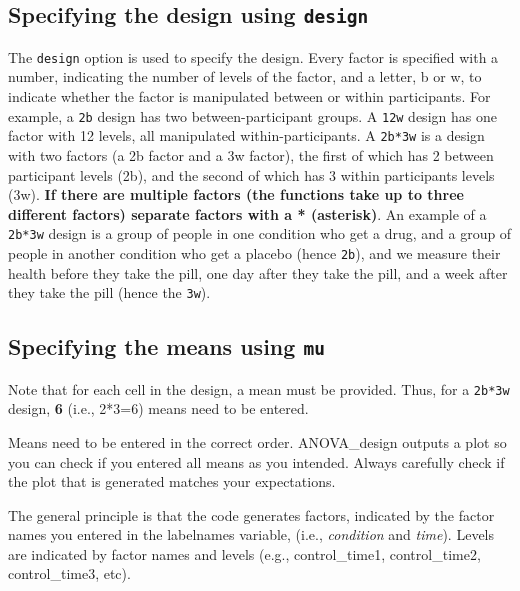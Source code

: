 \documentclass[
]{book}
\begin{document}
\hypertarget{specifying-the-design-using-design}{%
\subsection{\texorpdfstring{Specifying the design using \texttt{design}}{Specifying the design using design}}\label{specifying-the-design-using-design}}

The \texttt{design} option is used to specify the design.
Every factor is specified with a number, indicating the number of levels of the factor, and a letter, b or w, to indicate whether the factor is manipulated between or within participants.
For example, a \texttt{2b} design has two between-participant groups.
A \texttt{12w} design has one factor with 12 levels, all manipulated within-participants.
A \texttt{2b*3w} is a design with two factors (a 2b factor and a 3w factor), the first of which has 2 between participant levels (2b), and the second of which has 3 within participants levels (3w).
\textbf{If there are multiple factors (the functions take up to three different factors) separate factors with a * (asterisk)}.
An example of a \texttt{2b*3w} design is a group of people in one condition who get a drug, and a group of people in another condition who get a placebo (hence \texttt{2b}), and we measure their health before they take the pill, one day after they take the pill, and a week after they take the pill (hence the \texttt{3w}).

\hypertarget{specifying-the-means-using-mu}{%
\subsection{\texorpdfstring{Specifying the means using \texttt{mu}}{Specifying the means using mu}}\label{specifying-the-means-using-mu}}

Note that for each cell in the design, a mean must be provided. Thus, for a \texttt{2b*3w} design, \textbf{6} (i.e., 2*3=6) means need to be entered.

Means need to be entered in the correct order. ANOVA\_design outputs a plot so you can check if you entered all means as you intended. Always carefully check if the plot that is generated matches your expectations.

The general principle is that the code generates factors, indicated by the factor names you entered in the labelnames variable, (i.e., \emph{condition} and \emph{time}). Levels are indicated by factor names and levels (e.g., control\_time1, control\_time2, control\_time3, etc).
\end{document}
